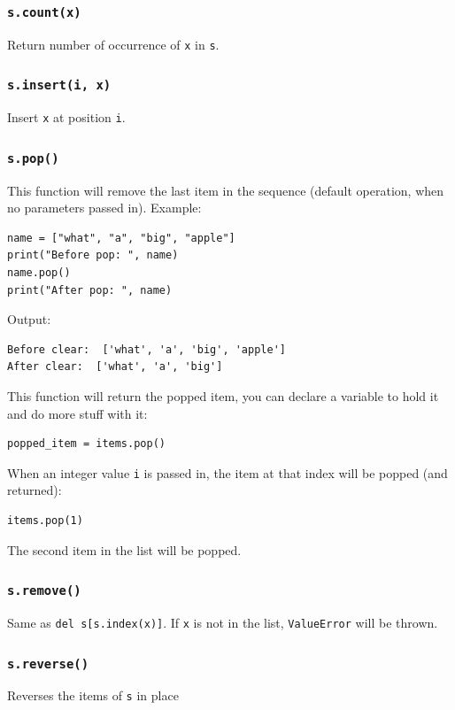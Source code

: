 \documentclass[12pt]{book}
\begin{document}
\subsubsection{\texttt{s.count(x)}}
\label{sec:org29f0ea1}
Return number of occurrence of \texttt{x} in \texttt{s}.

\subsubsection{\texttt{s.insert(i, x)}}
\label{sec:org121e6b4}
Insert \texttt{x} at position \texttt{i}.

\subsubsection{\texttt{s.pop()}}
\label{sec:orgbd70ce4}
This function will remove the last item in the sequence (default operation, when no parameters passed in). Example:
\begin{verbatim}
name = ["what", "a", "big", "apple"]
print("Before pop: ", name)
name.pop()
print("After pop: ", name)
\end{verbatim}
Output:
\begin{verbatim}
Before clear:  ['what', 'a', 'big', 'apple']
After clear:  ['what', 'a', 'big']
\end{verbatim}

This function will return the popped item, you can declare a variable to hold it and do more stuff with it:
\begin{verbatim}
popped_item = items.pop()
\end{verbatim}

When an integer value \texttt{i} is passed in, the item at that index will be popped (and returned):
\begin{verbatim}
items.pop(1)
\end{verbatim}
The second item in the list will be popped.
\subsubsection{\texttt{s.remove()}}
\label{sec:org4728f1b}
Same as \texttt{del s[s.index(x)]}. If \texttt{x} is not in the list, \texttt{ValueError} will be thrown.
\subsubsection{\texttt{s.reverse()}}
\label{sec:org5c3a745}
Reverses the items of \texttt{s} in place
\end{document}
